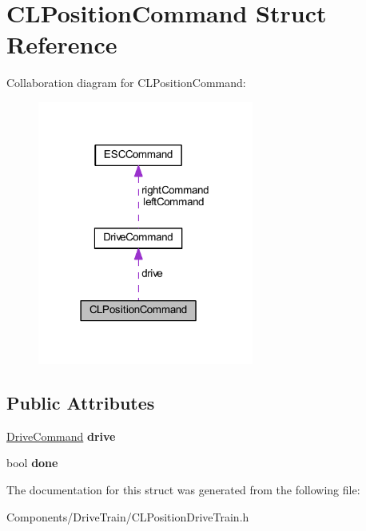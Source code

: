 \hypertarget{struct_c_l_position_command}{
\section{\-C\-L\-Position\-Command \-Struct \-Reference}
\label{struct_c_l_position_command}
}


\-Collaboration diagram for \-C\-L\-Position\-Command\-:\nopagebreak
\begin{figure}[H]
\begin{center}
\leavevmode
\includegraphics[width=201pt]{struct_c_l_position_command__coll__graph}
\end{center}
\end{figure}
\subsection*{\-Public \-Attributes}
\begin{DoxyCompactItemize}
\item 
\hypertarget{struct_c_l_position_command_a47f2f2d9984f07ef1f2fc93fd74184c5}{
\hyperlink{struct_drive_command}{\-Drive\-Command} {\bfseries drive}}
\label{struct_c_l_position_command_a47f2f2d9984f07ef1f2fc93fd74184c5}

\item 
\hypertarget{struct_c_l_position_command_abcdcf3f97bdf588e5e53b589dfc782c8}{
bool {\bfseries done}}
\label{struct_c_l_position_command_abcdcf3f97bdf588e5e53b589dfc782c8}

\end{DoxyCompactItemize}


\-The documentation for this struct was generated from the following file\-:\begin{DoxyCompactItemize}
\item 
\-Components/\-Drive\-Train/\-C\-L\-Position\-Drive\-Train.\-h\end{DoxyCompactItemize}
